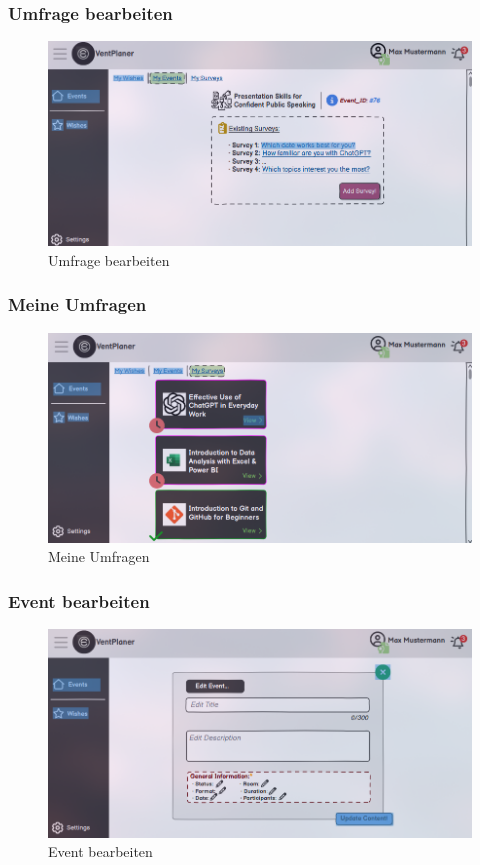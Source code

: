 \documentclass[a4paper,12pt]{article}
\begin{document}
\subsubsection{Umfrage bearbeiten}
\begin{figure}[H]
    \centering
    \includegraphics[width=1\textwidth]{Abbildungen/events/edit_survey.png}
    \caption{Umfrage bearbeiten}
    \label{fig:edit_survey}
\end{figure}

\subsubsection{Meine Umfragen}
\begin{figure}[H]
    \centering
    \includegraphics[width=1\textwidth]{Abbildungen/events/my_surveys.png}
    \caption{Meine Umfragen}
    \label{fig:my_survey}
\end{figure}

\subsubsection{Event bearbeiten}
\begin{figure}[H]
    \centering
    \includegraphics[width=1\textwidth]{Abbildungen/events/edit_event.png}
    \caption{Event bearbeiten}
    \label{fig:cedit_event}
\end{figure}
\end{document}
